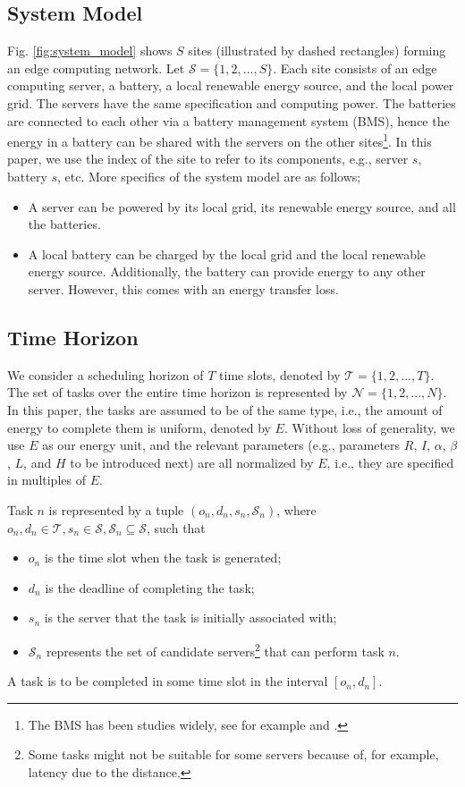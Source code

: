 \documentclass[conference, 10pt, ﬁnal, letterpaper, twocolumn]{IEEEtran}
\begin{document}
\subsection{System Model}
Fig. \ref{fig:system_model} shows $S$ sites (illustrated by dashed rectangles) forming an edge computing network. Let $\mathcal{S} = \{1,2,...,S\}$. Each site consists of an edge computing server, a battery, a local renewable energy source, and the local power grid. The servers have the same specification and computing power. The batteries are connected to each other via a battery management system (BMS), hence the energy in a battery can be shared with the servers on the other sites\footnote{The BMS has been studies widely, see for example \cite{leithon2013online} and \cite{leithon2019task}.}. In this paper, we use the index of the site to refer to its components, e.g., server $s$, battery $s$, etc. More specifics of the system model are as follows;
\begin{itemize}
    \item A server can be powered by its local grid, its renewable energy source, and all the batteries. 
    \item A local battery can be charged by the local grid and the local renewable energy source. Additionally, the battery can provide energy to any other server. However, this comes with an energy transfer loss.
\end{itemize}

\subsection{Time Horizon}
We consider a scheduling horizon of $T$ time slots, denoted by $\mathcal{T} = \{1,2,...,T\}$. The set of tasks over the entire time horizon is represented by $\mathcal{N} = \{1, 2, ..., N\}$. In this paper, the tasks are assumed to be of the same type, i.e., the amount of energy to complete them is uniform, denoted by $E$. Without loss of generality, we use $E$ as our energy unit, and the relevant parameters (e.g., parameters $R$, $I$, $\alpha$, $\beta$, $L$, and $H$ to be introduced next) are all normalized by $E$, i.e., they are specified in multiples of $E$. 

Task $n$ is represented by a tuple $(o_n, d_n, s_n, \mathcal{S}_n)$, where $o_n, d_n \in \mathcal{T}, s_n \in \mathcal{S}, \mathcal{S}_n \subseteq \mathcal{S}$, such that
\begin{itemize}
    \item $o_n$ is the time slot when the task is generated;
    \item $d_n$ is the deadline of completing the task;
    \item $s_n$ is the server that the task is initially associated with;
    \item $\mathcal{S}_n$ represents the set of candidate servers\footnote{Some tasks might not be suitable for some servers because of, for example, latency due to the distance.} that can perform task $n$.
\end{itemize}
A task is to be completed in some time slot in the interval $[o_n, d_n]$.
\end{document}

